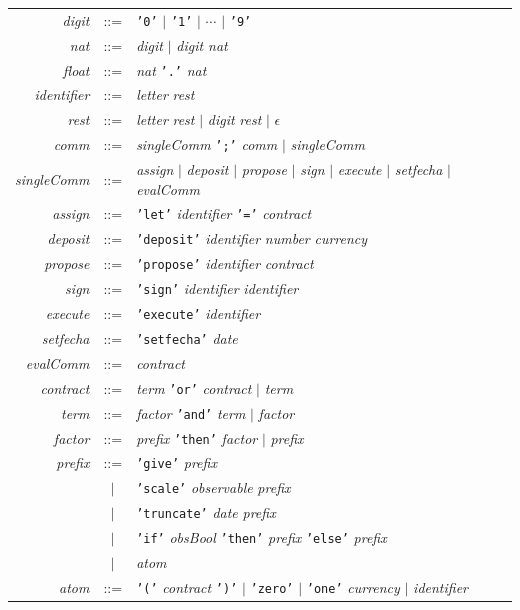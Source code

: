 \documentclass[a4paper, 12pt]{article}
\begin{document}
\begin{center}
\begin{tabular}{r c l}
\textit{digit} & ::= & \texttt{'0'} $|$ \texttt{'1'} $|$ $\cdots$ $|$ \texttt{'9'} \\
\textit{nat} & ::= & \textit{digit} $|$ \textit{digit nat} \\
\textit{float} & ::= & \textit{nat} \texttt{'.'} \textit{nat} \\
\textit{identifier} & ::= & \textit{letter} \textit{rest} \\
\textit{rest} & ::= & \textit{letter} \textit{rest} $|$ \textit{digit} \textit{rest} $|$ $\epsilon$ \\[10pt]

\textit{comm} & ::= & \textit{singleComm}  \texttt{';'} \textit{comm} $|$ \textit{singleComm} \\
\textit{singleComm} & ::= & \textit{assign} $|$ \textit{deposit} $|$ \textit{propose} $|$ \textit{sign} $|$ \textit{execute} $|$ \textit{setfecha} $|$ \textit{evalComm} \\
\textit{assign} & ::= & \texttt{'let'} \textit{identifier} \texttt{'='} \textit{contract} \\
\textit{deposit} & ::= & \texttt{'deposit'} \textit{identifier} \textit{number} \textit{currency} \\
\textit{propose} & ::= & \texttt{'propose'} \textit{identifier} \textit{contract} \\
\textit{sign} & ::= & \texttt{'sign'} \textit{identifier} \textit{identifier} \\
\textit{execute} & ::= & \texttt{'execute'} \textit{identifier} \\
\textit{setfecha} & ::= & \texttt{'setfecha'} \textit{date} \\
\textit{evalComm} & ::= & \textit{contract} \\[10pt]

\textit{contract} & ::= & \textit{term} \texttt{'or'} \textit{contract} $|$ \textit{term} \\
\textit{term} & ::= & \textit{factor}  \texttt{'and'} \textit{term} $|$ \textit{factor} \\
\textit{factor} & ::= & \textit{prefix}  \texttt{'then'} \textit{factor} $|$ \textit{prefix} \\
\textit{prefix} & ::= & \texttt{'give'} \textit{prefix} \\
    & $|$ & \texttt{'scale'} \textit{observable} \textit{prefix} \\
    & $|$ & \texttt{'truncate'} \textit{date} \textit{prefix} \\
    & $|$ & \texttt{'if'} \textit{obsBool} \texttt{'then'} \textit{prefix} \texttt{'else'} \textit{prefix} \\
    & $|$ & \textit{atom} \\
\textit{atom} & ::= & \texttt{'('} \textit{contract} \texttt{')'} $|$ \texttt{'zero'} $|$ \texttt{'one'} \textit{currency} $|$ \textit{identifier} \\[10pt]


\end{tabular}
\end{center}
\end{document}
